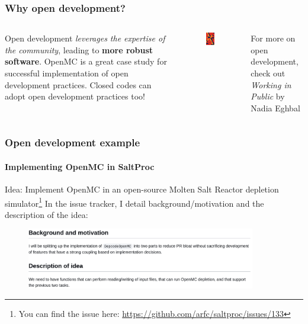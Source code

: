 \begin{frame}
  \frametitle{Why open development?} 
  \begin{columns}

      \column[t]{5cm}
      Open development {\it leverages the expertise of the community}, leading to {\bf more robust software}.
      \newline
      \newline
      OpenMC is a great case study for successful implementation of open development practices.
      \newline
      \newline
      Closed codes can adopt open development practices too!

      \column[t]{5cm}
      \begin{figure}[htpb]
          \centering
          \includegraphics[width=2cm]{images/working-in-public.png}
      \end{figure}
      For more on open development, check out {\it Working in Public} by Nadia Eghbal \cite{eghbal_working_2020}

      
  \end{columns}
\end{frame}

\begin{frame}[fragile]
    \frametitle{Open development example}
    \framesubtitle{Implementing OpenMC in SaltProc}

    Idea: Implement OpenMC in an open-source Molten Salt Reactor depletion simulator\footnote{You can find the issue here: \url{https://github.com/arfc/saltproc/issues/133}} 
    \newline
    \newline
    In the issue tracker, I detail background/motivation and the description of the idea:


    \vspace{0.5cm}
    \begin{figure}[htpb]
        \centering
        \includegraphics[width=10cm]{images/open-dev-ex1.png}
    \end{figure}

    
\end{frame}

